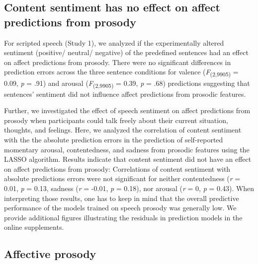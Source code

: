 \documentclass[
  english,
  man,floatsintext]{apa6}
\begin{document}
\hypertarget{content-sentiment-has-no-effect-on-affect-predictions-from-prosody}{%
\subsection{Content sentiment has no effect on affect predictions from prosody}\label{content-sentiment-has-no-effect-on-affect-predictions-from-prosody}}

For scripted speech (Study 1), we analyzed if the experimentally altered sentiment (positive/ neutral/ negative) of the predefined sentences had an effect on affect predictions from prosody. There were no significant differences in prediction errors across the three sentence conditions for valence (\emph{F}\textsubscript{(2,9905)} = 0.09,
\emph{p} = .91) and arousal (\emph{F}\textsubscript{(2,9905)} = 0.39,
\emph{p} = .68) predictions suggesting that sentences' sentiment did not influence affect predictions from prosodic features.

Further, we investigated the effect of speech sentiment on affect predictions from prosody when participants could talk freely about their current situation, thoughts, and feelings. Here, we analyzed the correlation of content sentiment with the the absolute prediction errors in the prediction of self-reported momentary arousal, contentedness, and sadness from prosodic features using the LASSO algorithm. Results indicate that content sentiment did not have an effect on affect predictions from prosody: Correlations of content sentiment with absolute predictions errors were not significant for neither contentedness (\emph{r} = 0.01, \emph{p} = 0.13, sadness (\emph{r} = -0.01, \emph{p} = 0.18), nor arousal (\emph{r} = 0, \emph{p} = 0.43). When interpreting those results, one has to keep in mind that the overall predictive performance of the models trained on speech prosody was generally low. We provide additional figures illustrating the residuals in prediction models in the online supplements.

\hypertarget{affective-prosody}{%
\subsection{Affective prosody}\label{affective-prosody}}
\end{document}
